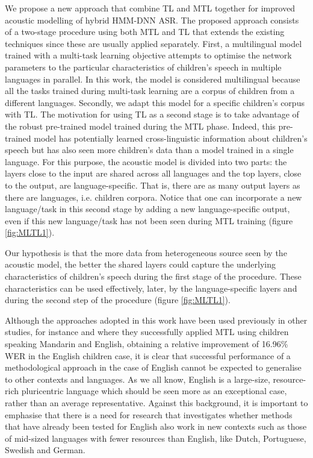 We propose a new approach that combine \ac{TL} and \ac{MTL} together for improved acoustic modelling of hybrid \ac{HMM-DNN} \ac{ASR}. The proposed approach consists of a two-stage procedure using both \ac{MTL} and \ac{TL} that extends the existing techniques since these are usually applied separately. First, a multilingual model trained with a multi-task learning objective attempts to optimise the network parameters to the particular characteristics of children's speech in multiple languages in parallel. In this work, the model is considered multilingual because all the tasks trained during multi-task learning are a corpus of children from  a different languages.
Secondly, we adapt this model for a specific children's corpus with \ac{TL}. The motivation for using \ac{TL} as a second stage is to take advantage of the robust pre-trained model trained during the \ac{MTL} phase. Indeed, this pre-trained model has potentially learned cross-linguistic information about children's speech but has also seen more children's data than a model trained in a single language. 
For this purpose, the acoustic model is divided into two parts: the layers close to the input are shared across all languages and the top layers, close to the output, are language-specific. That is, there are as many output layers as there are languages, i.e. children corpora. Notice that one can incorporate a new language/task in this second stage by adding a new language-specific output,  even if this new language/task has not been seen during  \ac{MTL} training (figure \ref{fig:MLTL1}).

Our hypothesis is that the more data from heterogeneous source seen by the acoustic model, the better the shared layers could capture the underlying characteristics of children's speech during the first stage of the procedure. These characteristics can be used effectively, later, by the language-specific layers and during the second step of the procedure (figure \ref{fig:MLTL1}). 

Although the approaches adopted in this work have been used previously in other studies, for instance \cite{TransferLF} and \cite{2019multi} where they successfully applied \ac{MTL} using children speaking  Mandarin and English, obtaining a relative improvement of 16.96\% \ac{WER} in the English children case, it is clear that successful performance of a methodological approach in the case of English cannot be expected to generalise to other contexts and languages.  
As we all know, English is a large-size, resource-rich pluricentric language which should be seen more as an exceptional case, rather than an average representative. Against this background, it is important to emphasise that there is a need for research that investigates whether methods that have already been tested for English also work in new contexts such as those of mid-sized languages with fewer resources than English, like Dutch, Portuguese, Swedish and German. 

